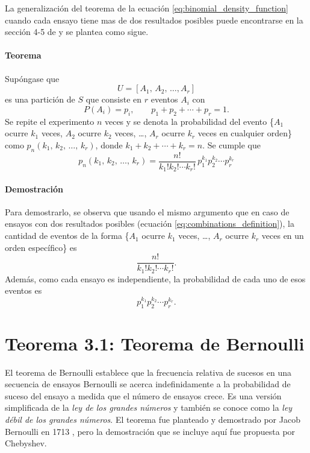 \documentclass[a4paper]{report}
\begin{document}
La generalización del teorema de la ecuación \ref{eq:binomial_density_function} cuando cada ensayo tiene mas de dos resultados posibles puede encontrarse en la sección 4-5 de \cite{papoulis2002probability} y se plantea como sigue. 

\paragraph{Teorema} Supóngase que 
\[
 U=[A_1,\,A_2,\,\dots,A_r]
\]
es una partición de \(S\) que consiste en \(r\) eventos \(A_i\) con
\[
 P(A_i)=p_i,\qquad p_1+p_2+\cdots+p_r=1.
\]
Se repite el experimento \(n\) veces y se denota la probabilidad del evento \{\(A_1\) ocurre \(k_1\) veces, \(A_2\) ocurre \(k_2\) veces, \ldots, \(A_r\) ocurre \(k_r\) veces en cualquier orden\} como \(p_n(k_1,\,k_2,\,\dots,\,k_r)\), donde \(k_1+k_2+\cdots+k_r=n\). Se cumple que
\begin{equation}\label{eq:bernoulli_trials_generalization}
 p_n(k_1,\,k_2,\,\dots,\,k_r)=\frac{n!}{k_1!k_2!\cdots k_r!}\,p_1^{k_1}p_2^{k_2}\cdots p_r^{k_r}
\end{equation}

\paragraph{Demostración} Para demostrarlo, se observa que usando el mismo argumento que en caso de ensayos con dos resultados posibles (ecuación \ref{eq:combinations_definition}), la cantidad de eventos de la forma \{\(A_1\) ocurre \(k_1\) veces, \ldots, \(A_r\) ocurre \(k_r\) veces en un orden específico\} es
\[
 \frac{n!}{k_1!k_2!\cdots k_r!}.
\]
Además, como cada ensayo es independiente, la probabilidad de cada uno de esos eventos es
\[
 p_1^{k_1}p_2^{k_2}\cdots p_r^{k_r}.
\]

\section{Teorema 3.1: Teorema de Bernoulli}\label{sec:bernoulli_theorem}

El teorema de Bernoulli establece que la frecuencia relativa de sucesos en una secuencia de ensayos Bernoulli se acerca indefinidamente a la probabilidad de suceso del ensayo a medida que el número de ensayos crece. Es una versión simplificada de la \emph{ley de los grandes números} y también se conoce como la \emph{ley débil de los grandes números}. El teorema fue planteado y demostrado por Jacob Bernoulli en 1713 \cite{papoulis2002probability}, pero la demostración que se incluye aquí fue propuesta por Chebyshev.
\end{document}
